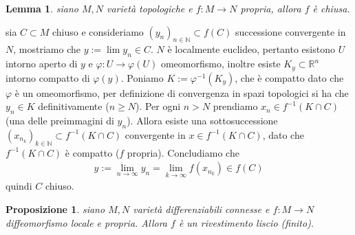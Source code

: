 \documentclass[oneside, 11pt]{amsbook}
\makeatletter
\newcommand{\R}{\mathbb{R}}
\newcommand{\vp}{\varphi}
\newcommand{\N}{{\mathbb N}}
\newcommand{\0}{{(0)}}
\newcommand{\3}{{(3)}}
\theoremstyle{colonplain}
\newtheorem{prop}[thm]{Proposizione}
\newtheorem{lemma}[thm]{Lemma}
\theoremstyle{colondefinition}
\theoremstyle{colonremark}
\numberwithin{equation}{chapter}
\renewcommand{\proofname}{Dimostrazione}
\renewenvironment{proof}[1][\proofname]{\par
  \pushQED{\qed}%
  \normalfont \topsep6\p@\@plus6\p@\relax
  \trivlist
  \item[\hskip\labelsep\bfseries #1:]\ignorespaces
}{%
  \popQED\endtrivlist\@endpefalse
}
\makeatother
\begin{document}
\begin{lemma}
    siano $M, N$ varietà topologiche e $f : M \longrightarrow N$ propria, allora $f$ è chiusa.
\end{lemma}
\begin{proof}
    sia $C \subset M$ chiuso e consideriamo $(y_n)_{n \in \N} \subset f(C)$ successione convergente in $N$, mostriamo che $y := \lim y_n \in C$. $N$ è localmente euclideo, pertanto esistono $U$ intorno aperto di $y$ e $\vp : U \longrightarrow \vp(U)$ omeomorfismo, inoltre esiste $K_y \subset \R^n$ intorno compatto di $\vp(y)$. Poniamo $K := \vp^{-1}(K_y)$, che è compatto dato che $\vp$ è un omeomorfismo, per definizione di convergenza in spazi topologici si ha che $y_n \in K$ definitivamente ($n \geq N$). Per ogni $n > N$ prendiamo $x_n \in f^{-1}(K \cap C)$ (una delle preimmagini di $y_n$). Allora esiste una sottosuccessione $(x_{n_k})_{k \in \N} \subset f^{-1}(K \cap C)$ convergente in $x \in f^{-1}(K \cap C)$, dato che $f^{-1}(K \cap C)$ è compatto ($f$ propria). Concludiamo che
    \begin{align}
        y := \lim_{n \rightarrow \infty} y_n = \lim_{k \rightarrow \infty} f(x_{n_k}) \in f(C)
    \end{align}
    quindi $C$ chiuso.
\end{proof}
\begin{prop}
    siano $M, N$ varietà differenziabili connesse e $f : M \longrightarrow N$ diffeomorfismo locale e propria. Allora $f$ è un rivestimento liscio (finito).
\end{prop}
\end{document}
